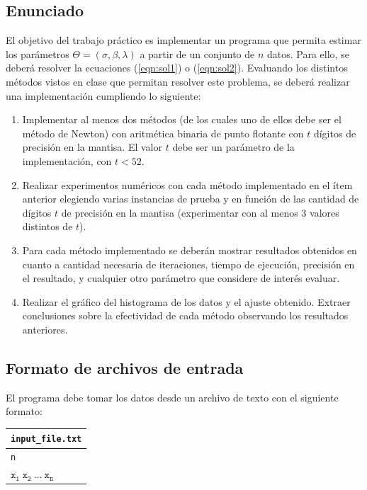 \documentclass[a4paper,10pt,twoside]{article}
\begin{document}
\subsection{Enunciado}

El objetivo del trabajo pr\'actico es implementar un programa que permita estimar los par\'ametros $\Theta=(\sigma,\beta,\lambda)$ a partir de un conjunto de $n$ datos. Para ello, se deber\'a resolver la ecuaciones (\ref{eqn:sol1}) o (\ref{eqn:sol2}).
Evaluando los distintos m\'etodos vistos en clase que permitan resolver este problema, se deber\'a realizar una implementaci\'on cumpliendo lo siguiente:

\begin{enumerate} 
\item Implementar al menos dos m\'etodos (de los cuales uno de ellos debe ser el m\'etodo de Newton) con aritm\'etica binaria de punto flotante con $t$ d\'igitos de precisi\'on en la mantisa. El valor $t$ debe ser un par\'ametro de la implementaci\'on, con $t<52$.
\item  Realizar experimentos num\'ericos con cada m\'etodo implementado en el \'item anterior elegiendo varias instancias de prueba y en funci\'on de las cantidad de d\'igitos $t$ de precisi\'on en la mantisa (experimentar con al menos 3 valores distintos de $t$).
\item Para cada m\'etodo implementado se deber\'an mostrar resultados obtenidos en cuanto a cantidad necesaria de iteraciones, tiempo de ejecuci\'on, precisi\'on en el resultado, y cualquier otro par\'ametro que considere de inter\'es evaluar.
\item Realizar el gr\'afico del histograma de los datos y el ajuste obtenido. Extraer conclusiones sobre la efectividad de cada m\'etodo observando los resultados anteriores.  
\end{enumerate}

\subsection{Formato de archivos de entrada}

El programa debe tomar los datos desde un archivo de texto con el siguiente formato:

\vspace{0.5cm}

\begin{tabular}{|l|} \hline 
\verb|input_file.txt|\\ \hline
\verb|n|\\ 
$\mathtt{x_1\ x_2\ \ldots\ x_n}$ \\ \hline
\end{tabular}
\end{document}
